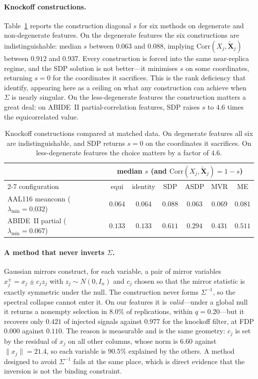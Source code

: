 \documentclass[11pt,a4paper]{article}
\newcommand{\Xt}{\tilde{\mathbf{X}}}
\newcommand{\ld}{\lambda_{\min}}
\begin{document}
\paragraph{Knockoff constructions.} Table~\ref{tab:construct} reports the
construction diagonal $s$ for six methods on degenerate and non-degenerate
features. On the degenerate features the six constructions are
indistinguishable: median $s$ between $0.063$ and $0.088$, implying
$\mathrm{Corr}(X_j,\Xt_j)$ between $0.912$ and $0.937$. Every construction
is forced into the same near-replica regime, and the SDP solution is not
better---it minimises $s$ on some coordinates, returning $s=0$ for the
coordinates it sacrifices. This is the rank deficiency that
\citet{spector2022powerful} identify, appearing here as a ceiling on what
any construction can achieve when $\Sigma$ is nearly singular. On the
less-degenerate features the construction matters a great deal: on ABIDE~II
partial-correlation features, SDP raises $s$ to $4.6$ times the
equicorrelated value.

\begin{table}[htbp]
\centering
{\small\setlength{\tabcolsep}{5pt}
\begin{tabular}{lcccccc}
\toprule
& \multicolumn{6}{c}{median $s$ (and $\mathrm{Corr}(X_j,\Xt_j)=1-s$)} \\
\cmidrule(lr){2-7}
configuration & equi & identity & SDP & ASDP & MVR & ME \\
\midrule
AAL116 meanconn ($\ld=0.032$) & $0.064$ & $0.064$ & $0.088$ & $0.063$ & $0.069$ & $0.081$ \\
ABIDE~II partial ($\ld=0.067$) & $0.133$ & $0.133$ & $\mathbf{0.611}$ & $0.294$ & $0.431$ & $0.511$ \\
\bottomrule
\end{tabular}}
\caption{Knockoff constructions compared at matched data. On degenerate
features all six are indistinguishable, and SDP returns $s=0$ on the
coordinates it sacrifices. On less-degenerate features the choice matters
by a factor of $4.6$.}
\label{tab:construct}
\end{table}

\paragraph{A method that never inverts $\Sigma$.} Gaussian mirrors
\citep{xing2023gaussian} construct, for each variable, a pair of mirror
variables $x_j^\pm = x_j \pm c_j z_j$ with $z_j\sim N(0,I_n)$ and $c_j$
chosen so that the mirror statistic is exactly symmetric under the null. The
construction never forms $\Sigma^{-1}$, so the spectral collapse cannot
enter it. On our features it is \emph{valid}---under a global null it
returns a nonempty selection in $8.0\%$ of replications, within
$q=0.20$---but it recovers only $0.421$ of injected signals against
$0.977$ for the knockoff filter, at FDP $0.000$ against $0.110$. The reason
is measurable and is the same geometry: $c_j$ is set by the residual of
$x_j$ on all other columns, whose norm is $6.60$ against $\|x_j\|=21.4$,
so each variable is $90.5\%$ explained by the others. A method designed to
avoid $\Sigma^{-1}$ fails at the same place, which is direct evidence that
the inversion is not the binding constraint.
\end{document}
